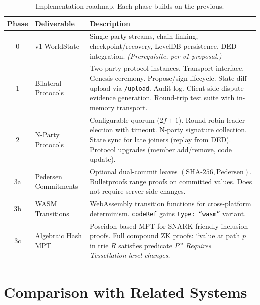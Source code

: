\documentclass[11pt,a4paper]{article}
\begin{document}
\begin{table}[H]
\centering
\begin{tabularx}{\textwidth}{clX}
\toprule
\textbf{Phase} & \textbf{Deliverable} & \textbf{Description} \\
\midrule
0 & v1 WorldState & Single-party streams, chain linking, checkpoint/recovery,
  LevelDB persistence, DED integration. \emph{(Prerequisite, per v1
  proposal.)} \\[8pt]
1 & Bilateral Protocols & Two-party protocol instances. Transport interface.
  Genesis ceremony. Propose/sign lifecycle. State diff upload via
  \texttt{/upload}. Audit log. Client-side dispute evidence generation.
  Round-trip test suite with in-memory transport. \\[8pt]
2 & N-Party Protocols & Configurable quorum ($2f+1$). Round-robin leader
  election with timeout. N-party signature collection. State sync for late
  joiners (replay from DED). Protocol upgrades (member add/remove, code
  update). \\[8pt]
3a & Pedersen Commitments & Optional dual-commit leaves
  $(\text{SHA-256}, \text{Pedersen})$. Bulletproofs range proofs on committed
  values. Does not require server-side changes. \\[8pt]
3b & WASM Transitions & WebAssembly transition functions for cross-platform
  determinism. \texttt{codeRef} gains \texttt{type: ``wasm''} variant. \\[8pt]
3c & Algebraic Hash MPT & Poseidon-based MPT for SNARK-friendly inclusion
  proofs. Full compound ZK proofs: ``value at path $p$ in trie $R$ satisfies
  predicate $P$.'' \emph{Requires Tessellation-level changes.} \\
\bottomrule
\end{tabularx}
\caption{Implementation roadmap. Each phase builds on the previous.}
\label{tab:roadmap}
\end{table}


\section{Comparison with Related Systems}
\end{document}
